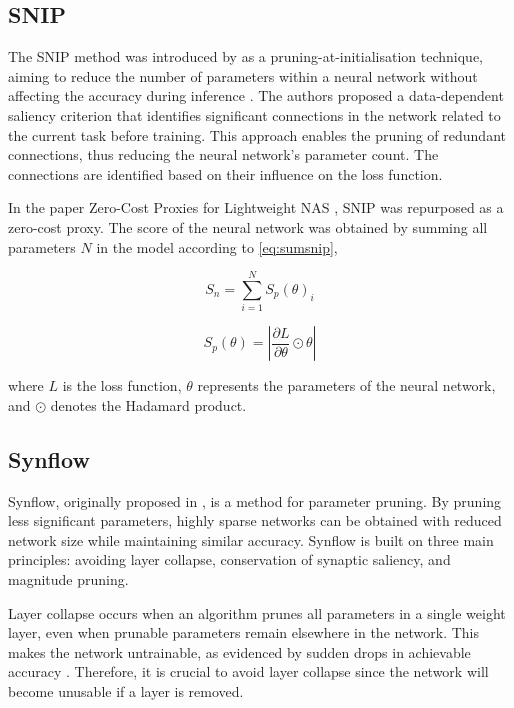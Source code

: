 \subsection{SNIP}
The \gls{SNIP} method was introduced by \autocite{lee2018snip} as a pruning-at-initialisation technique, aiming to reduce the number of parameters within a neural network without affecting the accuracy during inference \autocite{frankle2020pruning}. The authors proposed a data-dependent saliency criterion that identifies significant connections in the network related to the current task before training. This approach enables the pruning of redundant connections, thus reducing the neural network's parameter count. The connections are identified based on their influence on the loss function.

\noindent In the paper Zero-Cost Proxies for Lightweight \gls{NAS} \autocite{abdelfattah2021zero}, \gls{SNIP} was repurposed as a zero-cost proxy. The score of the neural network was obtained by summing all parameters $N$ in the model according to \cref{eq:sumsnip},

\begin{equation}\label{eq:sumsnip}
S_n = \sum_{i=1}^N S_p(\theta)_i
\end{equation}

\begin{equation}
S_p(\theta) = \left|\frac{\partial L}{\partial \theta} \odot \theta\right|
\end{equation}

where $L$ is the loss function, \(\theta \) represents the parameters of the neural network, and \(\odot\) denotes the Hadamard product.



\subsection{Synflow}
\gls{Synflow}, originally proposed in \autocite{tanaka2020pruning}, is a method for parameter pruning. By pruning less significant parameters, highly sparse networks can be obtained with reduced network size while maintaining similar accuracy. \gls{Synflow} is built on three main principles: avoiding layer collapse, conservation of synaptic saliency, and magnitude pruning.

\noindent Layer collapse occurs when an algorithm prunes all parameters in a single weight layer, even when prunable parameters remain elsewhere in the network. This makes the network untrainable, as evidenced by sudden drops in achievable accuracy \autocite{tanaka2020pruning}. Therefore, it is crucial to avoid layer collapse since the network will become unusable if a layer is removed.

